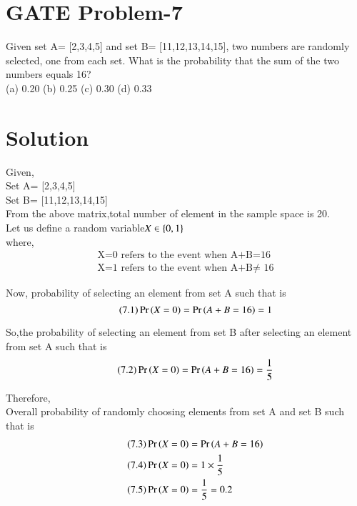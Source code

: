 \documentclass[journal,12pt,twocolumn]{IEEEtran}
\begin{document}
\section*{GATE Problem-7}
Given set A= [2,3,4,5] and set B= [11,12,13,14,15], two numbers are randomly selected, one from each set. What is the probability that the sum of the two numbers equals 16?\\
(a) 0.20 (b) 0.25 (c) 0.30 (d) 0.33    
\section*{Solution}
Given,\\
Set A= [2,3,4,5]\\
Set B= [11,12,13,14,15]\\

From the above matrix,total number of element in the sample space is 20.\\

Let us define a random variable$ X \in \left\{0,1\right\}$\\
where,
\begin{align*}
\text{X=0 refers to the event when A+B=16}\\
\text{X=1 refers to the event when A+B$\neq$ 16}    
\end{align*}

Now, probability of selecting an element from set A such that  is
\begin{equation}
   \tag{7.1}
    \Pr\left(X=0\right)=\Pr\left(A+B=16\right)=1
\end{equation}

So,the probability of selecting an element from set B after selecting an element from set A such that  is
\begin{equation}
    \tag{7.2}
    \Pr\left(X=0\right)=\Pr\left(A+B=16\right)= \frac{1}{5}
\end{equation}

Therefore,\\
Overall probability of randomly choosing elements from set A and set B such that is
\begin{align}
    \tag{7.3}
    \Pr\left(X=0\right)&=\Pr\left(A+B=16\right)\\
    \tag{7.4}
    \Pr\left(X=0\right)&=1 \times \frac{1}{5}\\
    \tag{7.5}
    \Pr\left(X=0\right)&= \frac{1}{5}=0.2
\end{align}
\end{document}
